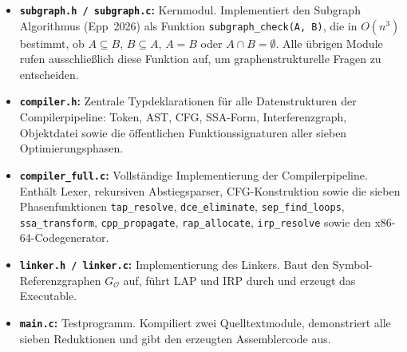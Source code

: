 ﻿\documentclass[a4paper,12pt]{article}
\theoremstyle{definition}
\begin{document}
\begin{center}
\end{center}

\begin{itemize}
	\item \textbf{\texttt{subgraph.h / subgraph.c}:}
	Kernmodul. Implementiert den Subgraph Algorithmus (Epp~2026) als
	Funktion \texttt{subgraph\_check(A, B)}, die in $O(n^3)$ bestimmt,
	ob $A \subseteq B$, $B \subseteq A$, $A = B$ oder $A \cap B =
	\emptyset$. Alle übrigen Module rufen ausschließlich diese Funktion
	auf, um graphenstrukturelle Fragen zu entscheiden.
	\item \textbf{\texttt{compiler.h}:}
	Zentrale Typdeklarationen für alle Datenstrukturen der
	Compilerpipeline: Token, AST, CFG, SSA-Form, Interferenzgraph,
	Objektdatei sowie die öffentlichen Funktionssignaturen aller
	sieben Optimierungsphasen.
	\item \textbf{\texttt{compiler\_full.c}:}
	Vollständige Implementierung der Compilerpipeline. Enthält Lexer,
	rekursiven Abstiegsparser, CFG-Konstruktion sowie die sieben
	Phasenfunktionen \texttt{tap\_resolve}, \texttt{dce\_eliminate},
	\texttt{sep\_find\_loops}, \texttt{ssa\_transform},
	\texttt{cpp\_propagate}, \texttt{rap\newline \_allocate},
	\texttt{irp\_resolve} sowie den x86-64-Codegenerator.
	\item \textbf{\texttt{linker.h / linker.c}:}
	Implementierung des Linkers. Baut den Symbol-Referenz\-graphen
	$G_{\mathcal{O}}$ auf, führt LAP und IRP durch und erzeugt das
	Executable.
	\item \textbf{\texttt{main.c}:}
	Testprogramm. Kompiliert zwei Quelltextmodule, demonstriert alle
	sieben Reduktionen und gibt den erzeugten Assemblercode aus.
\end{itemize}
\end{document}
